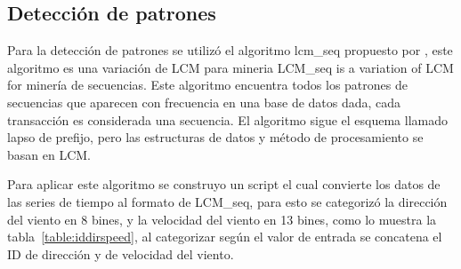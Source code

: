 \subsection{Detección de patrones}

Para la detección de patrones se utilizó el algoritmo lcm\_seq propuesto por \cite{uno_lcm_seq},
este algoritmo es una variación de LCM para mineria
LCM\_seq is a variation of LCM for minería de secuencias. 
Este algoritmo encuentra todos los patrones de secuencias que aparecen con frecuencia
en una base de datos dada, cada transacción es considerada una secuencia. El algoritmo sigue el esquema 
llamado lapso de prefijo, pero las estructuras de datos y método de procesamiento se basan en LCM.


Para aplicar este algoritmo se construyo un script el cual convierte los datos de las series de tiempo al
formato de LCM\_seq, para esto se categorizó la dirección del viento en 8 bines, y la velocidad del viento en 13 bines,
como lo muestra la tabla~\ref{table:iddirspeed}, al categorizar según el valor de entrada se concatena el ID de dirección y de velocidad del viento.

\begin{table}
\caption{IDs de velocidad y dirección de viento para cada grupo}
\label{table:iddirspeed}
\centering
{}
\end{table}

